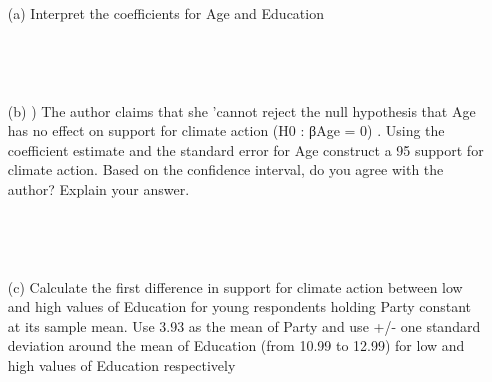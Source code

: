 \documentclass[12pt,letterpaper]{article}
\begin{document}
{\begin{enumerate}
\section*{Question 5: Climate Action}
The following is a regression where the outcome measures individuals’ desire to combat
climate change as indicated by feeling thermometer ratings (the variable ranges from 0 to 100
where 100 indicates high levels of support for action to combat climate change). Researchers
use three explanatory variables in their regression. First, they include a standard 7-point
party identification measure that ranges from 1-‘Strong Republican’ to 7-‘Strong Democrat’
(Party). Second, they include a dummy variable (0 or 1) indicating whether the respondent
is below the age of 70, or 70 and above (Age). Last, the researchers have information on
the number of years that respondents attended school (Education). The regression includes
N=1194 observations.

\item [(a)]  Interpret the coefficients for Age and Education


\begin{verbatim}
	
	
	
\end{verbatim}
\item [(b)] ) The author claims that she ’cannot reject the null hypothesis that Age has no effect
on support for climate action (H0 : βAge = 0) . Using the coefficient estimate and the
standard error for Age construct a 95%
support for climate action. Based on the confidence interval, do you agree with the
author? Explain your answer.

\begin{verbatim}
	
	
	
\end{verbatim}
\item [(c)] Calculate the first difference in support for climate action between low and high values
of Education for young respondents holding Party constant at its sample mean. Use
3.93 as the mean of Party and use +/- one standard deviation around the mean of
Education (from 10.99 to 12.99) for low and high values of Education respectively

\begin{verbatim}
	
	
	
\end{verbatim}
	\vspace{.5cm}
	\newpage

\end{enumerate}}
\end{document}
